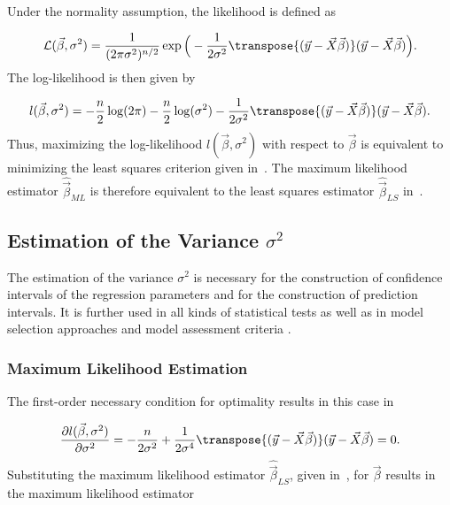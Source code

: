 Under the normality assumption, the likelihood is defined as \cite{wood2017generalized}

\begin{align} \label{eq:likelihood}
	\mathcal{L}(\vec{\beta}, \sigma^2) = \frac{1}{(2\pi\sigma^2)^{n/2}} \exp \Big( -\frac{1}{2\sigma^2}\transpose{(\vec{y} - \vec{X} \vec{\beta})}(\vec{y} - \vec{X} \vec{\beta}) \Big).
\end{align}
%
The log-likelihood is then given by

\begin{align} \label{eq:log_liklihood}
	l(\vec{\beta}, \sigma^2) = -\frac{n}{2}\log(2\pi) - \frac{n}{2}\log(\sigma^2) - \frac{1}{2\sigma^2}\transpose{(\vec{y} - \vec{X} \vec{\beta})}(\vec{y} - \vec{X} \vec{\beta}).
\end{align}
%
Thus, maximizing the log-likelihood $l(\vec{\beta}, \sigma^2)$ with respect to $\vec{\beta}$ is equivalent to minimizing the least squares criterion given in~. The maximum likelihood estimator $\hat{\vec{\beta}}_{ML}$ is therefore equivalent to the least squares estimator $\hat{\vec{\beta}}_{LS}$ in~.

\subsection{Estimation of the Variance $\sigma^2$}

The estimation of the variance $\sigma^2$ is necessary for the construction of confidence intervals of the regression parameters and for the construction of prediction intervals. It is further used in all kinds of statistical tests as well as in model selection approaches and model assessment criteria \cite{blobel2013statistische}.

\subsubsection{Maximum Likelihood Estimation}

The first-order necessary condition for optimality results in this case in 

\begin{align} \label{eq:log_likelihood_derivative_sigma}
	\frac{\partial l(\vec{\beta}, \sigma^2)}{\partial \sigma^2} = -\frac{n}{2\sigma^2} + \frac{1}{2\sigma^4}\transpose{(\vec{y} - \vec{X} \vec{\beta})}(\vec{y} - \vec{X}\vec{\beta}) = 0. 
\end{align}
%
Substituting the maximum likelihood estimator $\hat{\vec{\beta}}_{LS}$, given in~, for $\vec{\beta}$ results in the maximum likelihood estimator 


